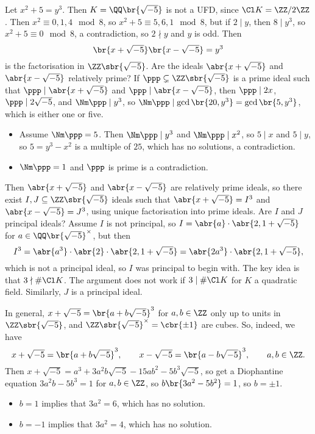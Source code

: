 \begin{example*}
Let $ x^2 + 5 = y^3 $. Then $ K = \QQ\br{\sqrt{-5}} $ is not a UFD, since $ \Cl K = \ZZ / 2\ZZ $. Then $ x^2 \equiv 0, 1, 4 \mod 8 $, so $ x^2 + 5 \equiv 5, 6, 1 \mod 8 $, but if $ 2 \mid y $, then $ 8 \mid y^3 $, so $ x^2 + 5 \equiv 0 \mod 8 $, a contradiction, so $ 2 \nmid y $ and $ y $ is odd. Then
$$ \br{x + \sqrt{-5}}\br{x - \sqrt{-5}} = y^3 $$
is the factorisation in $ \ZZ\sbr{\sqrt{-5}} $. Are the ideals $ \abr{x + \sqrt{-5}} $ and $ \abr{x - \sqrt{-5}} $ relatively prime? If $ \ppp \subsetneq \ZZ\sbr{\sqrt{-5}} $ is a prime ideal such that $ \ppp \mid \abr{x + \sqrt{-5}} $ and $ \ppp \mid \abr{x - \sqrt{-5}} $, then $ \ppp \mid 2x $, $ \ppp \mid 2\sqrt{-5} $, and $ \Nm \ppp \mid y^3 $, so $ \Nm \ppp \mid \gcd\br{20, y^3} = \gcd\br{5, y^3} $, which is either one or five.
\begin{itemize}
\item Assume $ \Nm \ppp = 5 $. Then $ \Nm \ppp \mid y^3 $ and $ \Nm \ppp \mid x^2 $, so $ 5 \mid x $ and $ 5 \mid y $, so $ 5 = y^3 - x^2 $ is a multiple of $ 25 $, which has no solutions, a contradiction.
\item $ \Nm \ppp = 1 $ and $ \ppp $ is prime is a contradiction.
\end{itemize}
Then $ \abr{x + \sqrt{-5}} $ and $ \abr{x - \sqrt{-5}} $ are relatively prime ideals, so there exist $ I, J \subseteq \ZZ\sbr{\sqrt{-5}} $ ideals such that $ \abr{x + \sqrt{-5}} = I^3 $ and $ \abr{x - \sqrt{-5}} = J^3 $, using unique factorisation into prime ideals. Are $ I $ and $ J $ principal ideals? Assume $ I $ is not principal, so $ I = \abr{a} \cdot \abr{2, 1 + \sqrt{-5}} $ for $ a \in \QQ\br{\sqrt{-5}}^\times $, but then
$$ I^3 = \abr{a^3} \cdot \abr{2} \cdot \abr{2, 1 + \sqrt{-5}} = \abr{2a^3} \cdot \abr{2, 1 + \sqrt{-5}}, $$
which is not a principal ideal, so $ I $ was principal to begin with. The key idea is that $ 3 \nmid \#\Cl K $. The argument does not work if $ 3 \mid \#\Cl K $ for $ K $ a quadratic field. Similarly, $ J $ is a principal ideal.

\pagebreak

In general, $ x + \sqrt{-5} = \br{a + b\sqrt{-5}}^3 $ for $ a, b \in \ZZ $ only up to units in $ \ZZ\sbr{\sqrt{-5}} $, and $ \ZZ\sbr{\sqrt{-5}}^\times = \cbr{\pm 1} $ are cubes. So, indeed, we have
$$ x + \sqrt{-5} = \br{a + b\sqrt{-5}}^3, \qquad x - \sqrt{-5} = \br{a - b\sqrt{-5}}^3, \qquad a, b \in \ZZ. $$
Then $ x + \sqrt{-5} = a^3 + 3a^2b\sqrt{-5} - 15ab^2 - 5b^3\sqrt{-5} $, so get a Diophantine equation $ 3a^2b - 5b^3 = 1 $ for $ a, b \in \ZZ $, so $ b\br{3a^2 - 5b^2} = 1 $, so $ b = \pm 1 $.
\begin{itemize}
\item $ b = 1 $ implies that $ 3a^2 = 6 $, which has no solution.
\item $ b = -1 $ implies that $ 3a^2 = 4 $, which has no solution.
\end{itemize}
\end{example*}


